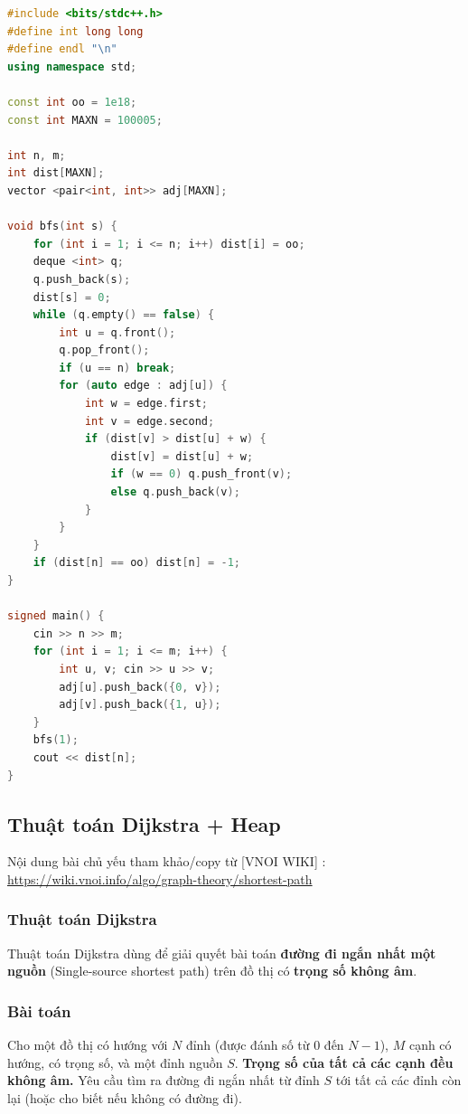 \documentclass{article}
\begin{document}
\begin{lstlisting}[language=C++, caption={Cài đặt, độ phức tạp $O(M + N)$}]
#include <bits/stdc++.h>
#define int long long
#define endl "\n"
using namespace std;

const int oo = 1e18;
const int MAXN = 100005;

int n, m;
int dist[MAXN];
vector <pair<int, int>> adj[MAXN];

void bfs(int s) {
    for (int i = 1; i <= n; i++) dist[i] = oo;
    deque <int> q;
    q.push_back(s);
    dist[s] = 0;
    while (q.empty() == false) {
        int u = q.front();
        q.pop_front();
        if (u == n) break;
        for (auto edge : adj[u]) {
            int w = edge.first;
            int v = edge.second;
            if (dist[v] > dist[u] + w) {
                dist[v] = dist[u] + w;
                if (w == 0) q.push_front(v);
                else q.push_back(v);
            }
        }
    }
    if (dist[n] == oo) dist[n] = -1;
}

signed main() {
    cin >> n >> m;
    for (int i = 1; i <= m; i++) {
        int u, v; cin >> u >> v;
        adj[u].push_back({0, v});
        adj[v].push_back({1, u});
    }
    bfs(1);
    cout << dist[n];
}
\end{lstlisting}

\subsection{Thuật toán Dijkstra + Heap}

Nội dung bài chủ yếu tham khảo/copy từ [VNOI WIKI] : \url{https://wiki.vnoi.info/algo/graph-theory/shortest-path}

\subsubsection{Thuật toán Dijkstra}


Thuật toán Dijkstra dùng để giải quyết bài toán \textbf{đường đi ngắn nhất một nguồn} (Single-source shortest path) trên đồ thị có \textbf{trọng số không âm}.

\subsubsection*{Bài toán}

Cho một đồ thị có hướng với $N$ đỉnh (được đánh số từ $0$ đến $N-1$), $M$ cạnh có hướng, có trọng số, và một đỉnh nguồn $S$. \textbf{Trọng số của tất cả các cạnh đều không âm.} Yêu cầu tìm ra đường đi ngắn nhất từ đỉnh $S$ tới tất cả các đỉnh còn lại (hoặc cho biết nếu không có đường đi).
\end{document}

